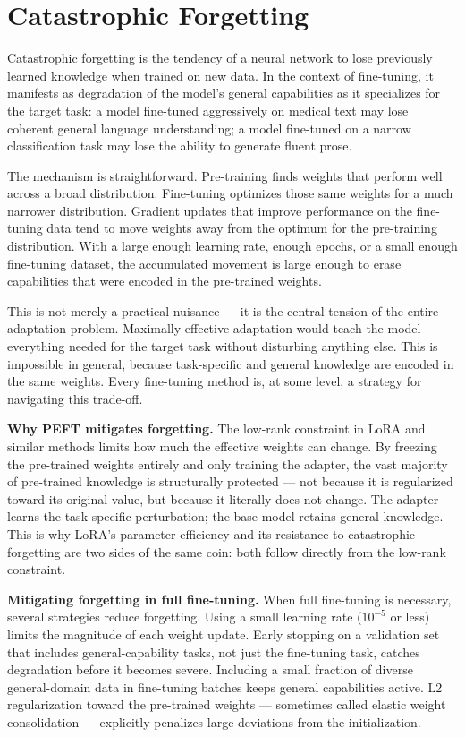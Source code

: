 \documentclass{book}
\begin{document}
\section{Catastrophic Forgetting}
\label{sec:forgetting}

Catastrophic forgetting is the tendency of a neural network to lose
previously learned knowledge when trained on new data. In the context
of fine-tuning, it manifests as degradation of the model's general
capabilities as it specializes for the target task: a model fine-tuned
aggressively on medical text may lose coherent general language
understanding; a model fine-tuned on a narrow classification task may
lose the ability to generate fluent prose.

The mechanism is straightforward. Pre-training finds weights that
perform well across a broad distribution. Fine-tuning optimizes those
same weights for a much narrower distribution. Gradient updates that
improve performance on the fine-tuning data tend to move weights away
from the optimum for the pre-training distribution. With a large enough
learning rate, enough epochs, or a small enough fine-tuning dataset,
the accumulated movement is large enough to erase capabilities that
were encoded in the pre-trained weights.

This is not merely a practical nuisance --- it is the central tension
of the entire adaptation problem. Maximally effective adaptation would
teach the model everything needed for the target task without disturbing
anything else. This is impossible in general, because task-specific and
general knowledge are encoded in the same weights. Every fine-tuning
method is, at some level, a strategy for navigating this trade-off.

\textbf{Why PEFT mitigates forgetting.} The low-rank constraint in LoRA
and similar methods limits how much the effective weights can change.
By freezing the pre-trained weights entirely and only training the
adapter, the vast majority of pre-trained knowledge is structurally
protected --- not because it is regularized toward its original value,
but because it literally does not change. The adapter learns the
task-specific perturbation; the base model retains general knowledge.
This is why LoRA's parameter efficiency and its resistance to
catastrophic forgetting are two sides of the same coin: both follow
directly from the low-rank constraint.

\textbf{Mitigating forgetting in full fine-tuning.} When full
fine-tuning is necessary, several strategies reduce forgetting. Using
a small learning rate ($10^{-5}$ or less) limits the magnitude of each
weight update. Early stopping on a validation set that includes
general-capability tasks, not just the fine-tuning task, catches
degradation before it becomes severe. Including a small fraction of
diverse general-domain data in fine-tuning batches keeps general
capabilities active. L2 regularization toward the pre-trained weights
--- sometimes called elastic weight consolidation --- explicitly
penalizes large deviations from the initialization.
\end{document}
